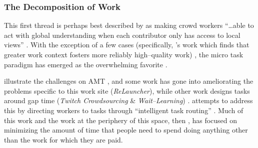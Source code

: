 \documentclass[trackingWork]{subfiles}
\begin{document}
\subsubsection[the decomposition of work]{The Decomposition of Work}\label{sec:decomposition}

\subsubsubsection{\crowdworkpers}
This first thread is
perhaps best described by \citeauthor{verroios2014context} as
making crowd workers ``\dots able to act with
global understanding when each contributor only has access to local views''
\cite{verroios2014context}.
With the exception of a few cases
(specifically, \citeauthor{Kinnaird:2012:WTM:2389176.2389219}'s work
which finds that greater work context fosters more reliably high--quality work)%
, the micro task paradigm has emerged as the overwhelming favorite
\cite{selfsourcingTeevan2014,selfsourcingTeevan2016%
,       cheng2015break,Kinnaird:2012:WTM:2389176.2389219}.


\citeauthor{taskSearch} illustrate the challenges on AMT%
, and some work has gone into ameliorating the problems specific to this work site
(\textit{ReLauncher}), %
while other work designs tasks around gap time
(\textit{Twitch Crowdsourcing} \& \textit{Wait--Learning})
\cite{taskSearch,KucherbaevReLauncher,Vaish:2014:TCC:2611222.2556996%
,       Cai:2015:WLW:2702123.2702267}.
\citeauthor{Cosley:2007:SUI:1216295.1216309}
attempts to address this by
directing workers to tasks through
``intelligent task routing''
\cite{Cosley:2007:SUI:1216295.1216309}.
Much of this work and the work at the periphery of this space, then%
, has focused on
minimizing the amount of time that people need to spend doing
anything other than the work for which they are paid.
\end{document}
